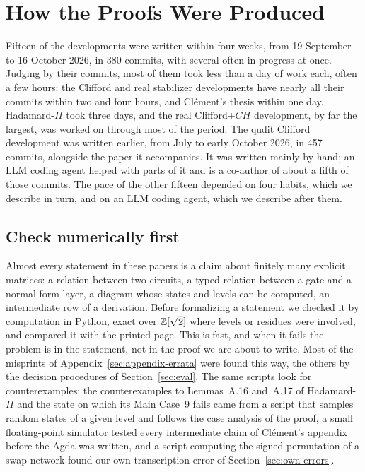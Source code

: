 \section{How the Proofs Were Produced}\label{sec:method}

Fifteen of the developments were written within four weeks, from 19
September to 16 October 2026, in 380 commits, with several often in
progress at once. Judging by their commits, most of them took less
than a day of work each, often a few hours: the
Clifford and real stabilizer developments have nearly all their
commits within two and four hours, and Cl\'ement's thesis within one
day. Hadamard-$\Pi$ took three days, and the real Clifford+$CH$
development, by far the largest, was worked on through most of the
period. The qudit Clifford
development was written earlier, from July to early October 2026, in
457 commits, alongside the paper it accompanies. It was written mainly
by hand; an LLM coding agent helped with parts of it and is a co-author
of about a fifth of those commits. The pace of the other fifteen
depended on four habits, which we describe in turn, and on an LLM
coding agent, which we describe after them.

\subsection{Check numerically first}\label{sec:numerical}

Almost every statement in these papers is a claim about finitely many
explicit matrices: a relation between two circuits, a typed relation
between a gate and a normal-form layer, a diagram whose states and
levels can be computed, an intermediate row of a derivation. Before
formalizing a statement we checked it by computation in Python, exact
over $\mathbb{Z}[\sqrt2]$ where levels or residues were involved, and compared
it with the printed page. This is fast, and when it fails the problem
is in the statement, not in the proof we are about to write. Most of
the misprints of Appendix~\ref{sec:appendix-errata} were found this
way, the others by the decision procedures of Section~\ref{sec:eval}.
The same scripts look for counterexamples: the counterexamples to
Lemmas~A.16 and~A.17 of Hadamard-$\Pi$ and the state on which its Main
Case~9 fails came from a script that samples random states of a given
level and follows the case analysis of the proof, a small
floating-point simulator tested every intermediate claim of
Cl\'ement's appendix before the Agda was written, and a script
computing the signed permutation of a swap network found our own
transcription error of Section~\ref{sec:own-errors}.

